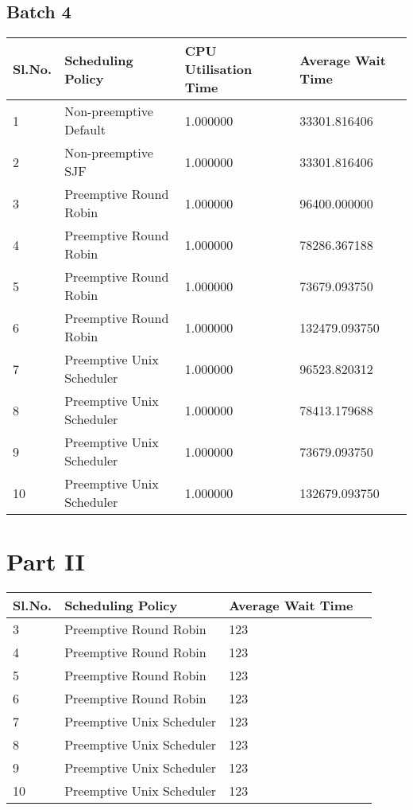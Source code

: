 \documentclass{article}
\begin{document}
\subsection{Batch 4}
\begin{center}
    \begin{tabular}{| l | l | l | l |}
    \hline
    Sl.No. & Scheduling Policy & CPU Utilisation Time & Average Wait Time \\ \hline
    1 & Non-preemptive Default & 1.000000 & 33301.816406 \\
    2 & Non-preemptive SJF & 1.000000 & 33301.816406 \\
    3 & Preemptive Round Robin & 1.000000 & 96400.000000 \\
    4 & Preemptive Round Robin & 1.000000 & 78286.367188 \\
    5 & Preemptive Round Robin & 1.000000 & 73679.093750 \\
    6 & Preemptive Round Robin & 1.000000 & 132479.093750 \\
    7 & Preemptive Unix Scheduler & 1.000000 & 96523.820312 \\
    8 & Preemptive Unix Scheduler & 1.000000 & 78413.179688 \\
    9 & Preemptive Unix Scheduler & 1.000000 & 73679.093750 \\
    10 & Preemptive Unix Scheduler & 1.000000 & 132679.093750 \\
    \hline
    \end{tabular}
\end{center}
\section{Part II}
\begin{center}
    \begin{tabular}{| l | l | l | l |}
    \hline
    Sl.No. & Scheduling Policy & Average Wait Time \\ \hline
    3 & Preemptive Round Robin & 123 \\
    4 & Preemptive Round Robin & 123 \\
    5 & Preemptive Round Robin & 123 \\
    6 & Preemptive Round Robin & 123 \\
    7 & Preemptive Unix Scheduler & 123 \\
    8 & Preemptive Unix Scheduler & 123 \\
    9 & Preemptive Unix Scheduler & 123 \\
    10 & Preemptive Unix Scheduler & 123 \\
    \hline
    \end{tabular}
\end{center}
\end{document}
